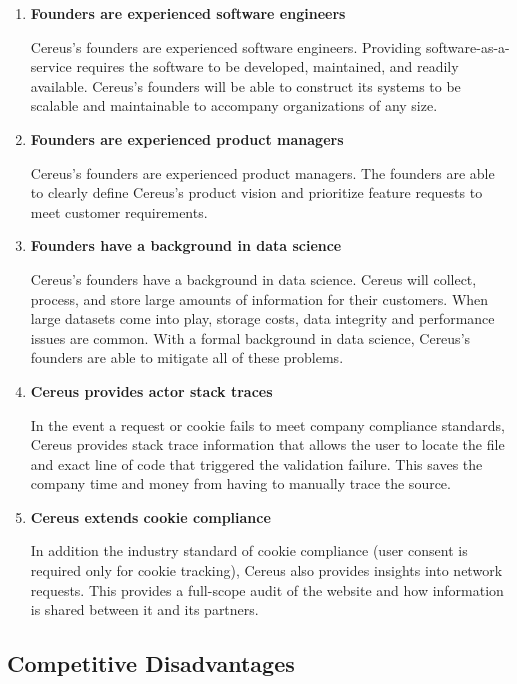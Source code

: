 \begin{enumerate}
  \item \textbf{Founders are experienced software engineers}
  
  Cereus's founders are experienced software engineers. Providing software-as-a-service requires the software to be developed, maintained, and readily available. Cereus's founders will be able to construct its systems to be scalable and maintainable to accompany organizations of any size.
  
  \item \textbf{Founders are experienced product managers}

  Cereus's founders are experienced product managers. The founders are able to clearly define Cereus's product vision and prioritize feature requests to meet customer requirements.

  \item \textbf{Founders have a background in data science}

  Cereus's founders have a background in data science. Cereus will collect, process, and store large amounts of information for their customers. When large datasets come into play, storage costs, data integrity and performance issues are common. With a formal background in data science, Cereus's founders are able to mitigate all of these problems.

  \item \textbf{Cereus provides actor stack traces}

  In the event a request or cookie fails to meet company compliance standards, Cereus provides stack trace information that allows the user to locate the file and exact line of code that triggered the validation failure. This saves the company time and money from having to manually trace the source.

  \item \textbf{Cereus extends cookie compliance}

  In addition the industry standard of cookie compliance (user consent is required only for cookie tracking), Cereus also provides insights into network requests. This provides a full-scope audit of the website and how information is shared between it and its partners.

\end{enumerate}

\subsection{Competitive Disadvantages}

